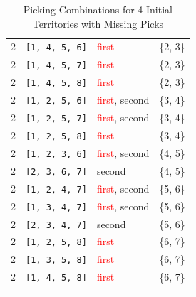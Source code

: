 \begin{longtable}{|p{2.5cm}|p{3cm}|p{2.5cm}|c|}
\hline\hline
2 & \texttt{[1, 4, 5, 6]} & \textcolor{red}{first} & \{2, 3\} \\ 
2 & \texttt{[1, 4, 5, 7]} & \textcolor{red}{first} & \{2, 3\} \\ 
\rowcolor{Light_Blue}
2 & \texttt{[1, 4, 5, 8]} & \textcolor{red}{first} & \{2, 3\} \\ \hline
2 & \texttt{[1, 2, 5, 6]} & \textcolor{red}{first}, \textcolor{CustomBlue}{second} & \{3, 4\} \\ 
2 & \texttt{[1, 2, 5, 7]} & \textcolor{red}{first}, \textcolor{CustomBlue}{second} & \{3, 4\} \\ 
2 & \texttt{[1, 2, 5, 8]} & \textcolor{red}{first} & \{3, 4\} \\ \hline
2 & \texttt{[1, 2, 3, 6]} & \textcolor{red}{first}, \textcolor{CustomBlue}{second} & \{4, 5\} \\ 
2 & \texttt{[2, 3, 6, 7]} & \textcolor{CustomBlue}{second} & \{4, 5\} \\ \hline
2 & \texttt{[1, 2, 4, 7]} & \textcolor{red}{first}, \textcolor{CustomBlue}{second} & \{5, 6\} \\ 
2 & \texttt{[1, 3, 4, 7]} & \textcolor{red}{first}, \textcolor{CustomBlue}{second} & \{5, 6\} \\ 
2 & \texttt{[2, 3, 4, 7]} & \textcolor{CustomBlue}{second} & \{5, 6\} \\ \hline
2 & \texttt{[1, 2, 5, 8]} & \textcolor{red}{first} & \{6, 7\} \\ 
2 & \texttt{[1, 3, 5, 8]} & \textcolor{red}{first} & \{6, 7\} \\ 
\rowcolor{Light_Blue}
2 & \texttt{[1, 4, 5, 8]} & \textcolor{red}{first} & \{6, 7\} \\ \hline

\caption{Picking Combinations for 4 Initial Territories with Missing Picks}
\label{tab:4territories_consecutive}
\end{longtable}
\normalsize


